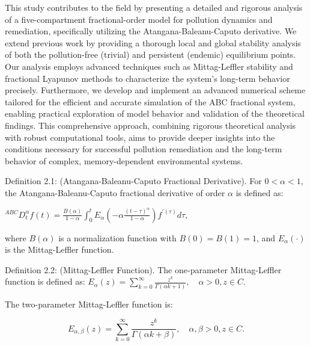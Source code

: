 \documentclass[10pt]{NSP1}
\begin{document}
This study contributes to the field by presenting a detailed and rigorous analysis of a five-compartment fractional-order model for pollution dynamics and remediation, specifically utilizing the Atangana-Baleanu-Caputo derivative. We extend previous work by providing a thorough local and global stability analysis of both the pollution-free (trivial) and persistent (endemic) equilibrium points. Our analysis employs advanced techniques such as Mittag-Leffler stability and fractional Lyapunov methods to characterize the system’s long-term behavior precisely. Furthermore, we develop and implement an advanced numerical scheme tailored for the efficient and accurate simulation of the ABC fractional system, enabling practical exploration of model behavior and validation of the theoretical findings. This comprehensive approach, combining rigorous theoretical analysis with robust computational tools, aims to provide deeper insights into the conditions necessary for successful pollution remediation and the long-term behavior of complex, memory-dependent environmental systems.

\par\medskip{}\smallskip

\par\medskip{}\smallskip

Definition 2.1: (Atangana-Baleanu-Caputo Fractional Derivative). \cite{ref1} For \(0 < \alpha < 1\), the Atangana-Baleanu-Caputo fractional derivative of order \(\alpha\) is defined as:

\(^{ABC}D_{t}^{\alpha}f(t) = \frac{B(\alpha)}{1 - \alpha}\int_{0}^{t}{}E_{\alpha}\left( - \alpha\frac{(t - \tau)^{\alpha}}{1 - \alpha} \right)f^{'(\tau)}d\tau,\)

where \(B(\alpha)\) is a normalization function with \(B(0) = B(1) = 1\), and \(E_{\alpha}( \cdot )\) is the Mittag-Leffler function.

Definition 2.2: (Mittag-Leffler Function).\cite{ref7} The one-parameter Mittag-Leffler function is defined as: \(E_{\alpha}(z) = \sum_{k = 0}^{\infty}{}\frac{z^{k}}{\Gamma(\alpha k + 1)},\quad\alpha > 0,z \in C\).

The two-parameter Mittag-Leffler function is:

\[
E_{\alpha,\beta}(z) = \sum_{k = 0}^{\infty}{}\frac{z^{k}}{\Gamma(\alpha k + \beta)},\quad\alpha,\beta > 0,z \in C.
\]
\end{document}
